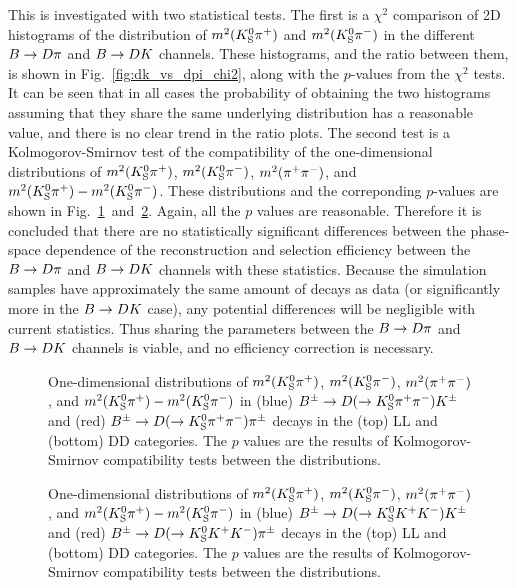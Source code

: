 This is investigated with two statistical tests. The first is a $\chi^2$ comparison of 2D histograms of the distribution of $m^2({{K}^0_{\mathrm{S}}}{{\pi}^+})$ and $m^2({{K}^0_{\mathrm{S}}}{{\pi}^-})$ in the different ${B}\rightarrow{\ensuremath{D}}\pi$ and ${B}\rightarrow{\ensuremath{D}}{\ensuremath{K}}$ channels. These histograms, and the ratio between them, is shown in Fig.~\ref{fig:dk_vs_dpi_chi2}, along with the $p$-values from the $\chi^2$ tests. It can be seen that in all cases the probability of obtaining the two histograms assuming that they share the same underlying distribution has a reasonable value, and there is no clear trend in the ratio plots. The second test is a Kolmogorov-Smirnov test of the compatibility of the one-dimensional distributions of $m^2({{K}^0_{\mathrm{S}}}{{\pi}^+})$, $m^2({{K}^0_{\mathrm{S}}}{{\pi}^-})$, $m^2({{\pi}^+}{{\pi}^-})$, and $m^2({{K}^0_{\mathrm{S}}}{{\pi}^+}) - m^2({{K}^0_{\mathrm{S}}}{{\pi}^-})$. These distributions and the correponding $p$-values are shown in Fig.~\ref{fig:KolSmi_PiPi}~and~\ref{fig:KolSmi_KK}. Again, all the $p$ values are reasonable. Therefore it is concluded that there are no statistically significant differences between the phase-space dependence of the reconstruction and selection efficiency between the ${B}\rightarrow{\ensuremath{D}}\pi$ and ${B}\rightarrow{\ensuremath{D}}{\ensuremath{K}}$ channels with these statistics. Because the simulation samples have approximately the same amount of decays as data (or significantly more in the ${B}\rightarrow{\ensuremath{D}}{\ensuremath{K}}$ case), any potential differences will be negligible with current statistics. Thus sharing the \Fi parameters between the ${B}\rightarrow{\ensuremath{D}}\pi$ and ${B}\rightarrow{\ensuremath{D}}{\ensuremath{K}}$ channels is viable, and no efficiency correction is necessary. 

\begin{figure}[tbp]
    \centering
    \caption{One-dimensional distributions of $m^2({{K}^0_{\mathrm{S}}}{{\pi}^+})$, $m^2({{K}^0_{\mathrm{S}}}{{\pi}^-})$, $m^2({{\pi}^+}{{\pi}^-})$, and ${m^2({{K}^0_{\mathrm{S}}}{{\pi}^+}) - m^2({{K}^0_{\mathrm{S}}}{{\pi}^-})}$ in (blue) ${{B}^\pm}\rightarrow{\ensuremath{D}}(\rightarrow{\ensuremath{{K}^0_{\mathrm{S}}}}{\ensuremath{{\pi}^+}}{\ensuremath{{\pi}^-}}){{K}^\pm}$ and (red) ${{B}^\pm}\rightarrow{\ensuremath{D}}(\rightarrow{\ensuremath{{K}^0_{\mathrm{S}}}}{\ensuremath{{\pi}^+}}{\ensuremath{{\pi}^-}}){{\pi}^\pm}$ decays in the (top) LL and (bottom) DD categories. The $p$ values are the results of Kolmogorov-Smirnov compatibility tests between the distributions.}
    \label{fig:KolSmi_PiPi}
\end{figure}

\begin{figure}[tbp]
    \centering
    \caption{One-dimensional distributions of $m^2({{K}^0_{\mathrm{S}}}{{\pi}^+})$, $m^2({{K}^0_{\mathrm{S}}}{{\pi}^-})$, $m^2({{\pi}^+}{{\pi}^-})$, and ${m^2({{K}^0_{\mathrm{S}}}{{\pi}^+}) - m^2({{K}^0_{\mathrm{S}}}{{\pi}^-})}$ in (blue) ${{B}^\pm}\rightarrow{\ensuremath{D}}(\rightarrow{\ensuremath{{K}^0_{\mathrm{S}}}}{\ensuremath{{K}^+}}{\ensuremath{{K}^-}}){{K}^\pm}$ and (red) ${{{B}^\pm}\rightarrow{\ensuremath{D}}(\rightarrow{\ensuremath{{K}^0_{\mathrm{S}}}}{\ensuremath{{K}^+}}{\ensuremath{{K}^-}}){{\pi}^\pm}}$ decays in the (top) LL and (bottom) DD categories. The $p$ values are the results of Kolmogorov-Smirnov compatibility tests between the distributions.}
    \label{fig:KolSmi_KK}
\end{figure}

